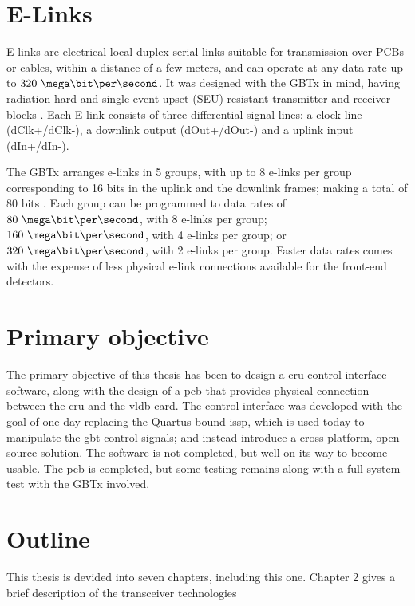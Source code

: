 \documentclass[main.tex]{subfiles}
\begin{document}
\section{E-Links} \label{sec:elinks}
E-links are electrical local duplex  serial links suitable for transmission over PCBs or cables, within a distance of a few meters, and can operate at any data rate up to $320~\mega\bit\per\second$. It was designed with the GBTx in mind, having radiation hard and single event upset (SEU) resistant transmitter and receiver blocks \cite{elinks}. Each E-link consists of three differential signal lines: a clock line (dClk+/dClk-), a downlink output (dOut+/dOut-) and a uplink input (dIn+/dIn-).

The GBTx arranges e-links in 5 groups, with up to 8 e-links per group corresponding to 16 bits in the uplink and the downlink frames; making a total of 80 bits \cite{gbtxman11}. Each group can be programmed to data rates of $80~\mega\bit\per\second$, with 8 e-links per group; $160~\mega\bit\per\second$, with 4 e-links per group; or $320~\mega\bit\per\second$, with 2 e-links per group. Faster data rates comes with the expense of less physical e-link connections available for the front-end detectors.

\section{Primary objective}
The primary objective of this thesis has been to design a \gls{cru} control interface software, along with the design of a \gls{pcb} that provides physical connection between the \gls{cru} and the \gls{vldb} card. The control interface was developed with the goal of one day replacing the Quartus-bound \gls{issp}, which is used today to manipulate the \gls{gbt} control-signals; and instead introduce a cross-platform, open-source solution. The software is not completed, but well on its way to become usable. The \gls{pcb} is completed, but some testing remains along with a full system test with the GBTx involved.

\section{Outline}
This thesis is devided into seven chapters, including this one. Chapter 2 gives a brief description of the transceiver technologies 

\end{document}

